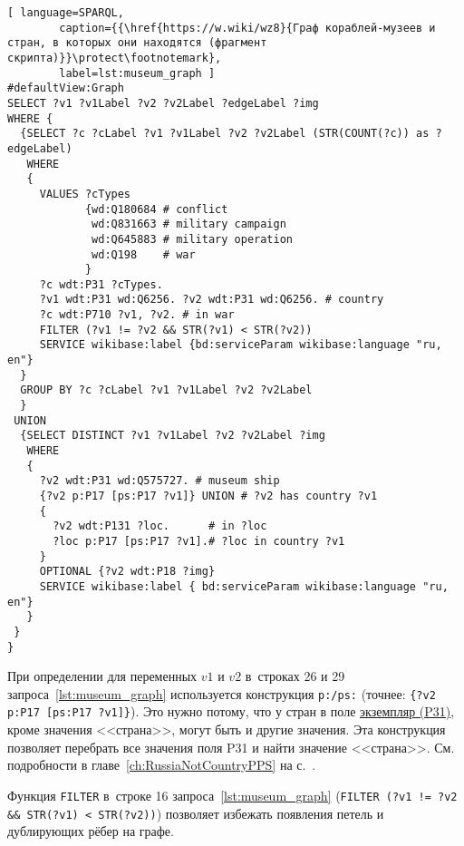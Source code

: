 \begin{lstlisting}[ language=SPARQL, 
        caption={{\href{https://w.wiki/wz8}{Граф кораблей-музеев и стран, в которых они находятся (фрагмент скрипта)}}\protect\footnotemark}, 
        label=lst:museum_graph ]
#defaultView:Graph    
SELECT ?v1 ?v1Label ?v2 ?v2Label ?edgeLabel ?img 
WHERE {
  {SELECT ?c ?cLabel ?v1 ?v1Label ?v2 ?v2Label (STR(COUNT(?c)) as ?edgeLabel) 
   WHERE
   {
     VALUES ?cTypes 
            {wd:Q180684 # conflict
             wd:Q831663 # military campaign
             wd:Q645883 # military operation
             wd:Q198    # war
            } 
     ?c wdt:P31 ?cTypes.
     ?v1 wdt:P31 wd:Q6256. ?v2 wdt:P31 wd:Q6256. # country
     ?c wdt:P710 ?v1, ?v2. # in war
     FILTER (?v1 != ?v2 && STR(?v1) < STR(?v2)) 
     SERVICE wikibase:label {bd:serviceParam wikibase:language "ru, en"}
  }
  GROUP BY ?c ?cLabel ?v1 ?v1Label ?v2 ?v2Label
  }
 UNION
  {SELECT DISTINCT ?v1 ?v1Label ?v2 ?v2Label ?img
   WHERE
   {
     ?v2 wdt:P31 wd:Q575727. # museum ship
     {?v2 p:P17 [ps:P17 ?v1]} UNION # ?v2 has country ?v1
     {
       ?v2 wdt:P131 ?loc.      # in ?loc
       ?loc p:P17 [ps:P17 ?v1].# ?loc in country ?v1
     } 
     OPTIONAL {?v2 wdt:P18 ?img}
     SERVICE wikibase:label { bd:serviceParam wikibase:language "ru, en"}
   }
 }
}
\end{lstlisting}


\newpage
    При определении  для переменных $v1$ и $v2$ 
    в~строках 26 и 29 запроса~\ref{lst:museum_graph} 
    используется конструкция \texttt{p:/ps:} (точнее: \texttt{\{?v2 p:P17 [ps:P17 ?v1]\}}). 
    Это нужно потому, что у стран в поле 
    \href{https://www.wikidata.org/wiki/Property:P31}{экземпляр (P31)}, 
    кроме значения <<страна>>, могут быть и другие значения. 
    Эта конструкция позволяет перебрать все значения поля P31 и найти значение <<страна>>.
    См. подробности в главе~\ref{ch:RussiaNotCountryPPS} на с.~\pageref{ch:RussiaNotCountryPPS}.

    Функция \lstinline|FILTER|
    в~строке 16 запроса~\ref{lst:museum_graph} 
    \mbox{(\lstinline|FILTER (?v1 != ?v2 && STR(?v1) < STR(?v2))|)} 
    позволяет избежать появления петель и дублирующих рёбер на графе.


